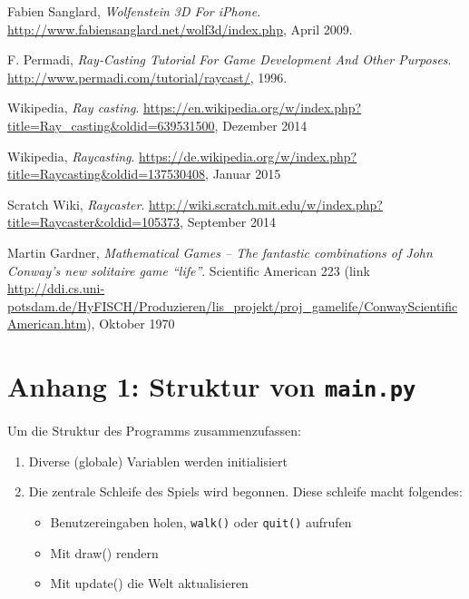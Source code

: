 \documentclass[a4paper,12pt]{report}
\begin{document}
\begin{thebibliography}{9}

  Fabien Sanglard,
  \emph{Wolfenstein 3D For iPhone}.
  \url{http://www.fabiensanglard.net/wolf3d/index.php},
  April 2009.

  F. Permadi,
  \emph{Ray-Casting Tutorial For Game Development And Other Purposes}.
  \url{http://www.permadi.com/tutorial/raycast/},
  1996.

  Wikipedia,
  \emph{Ray casting}.
  \url{https://en.wikipedia.org/w/index.php?title=Ray_casting&oldid=639531500},
  Dezember 2014

  Wikipedia,
  \emph{Raycasting}.
  \url{https://de.wikipedia.org/w/index.php?title=Raycasting&oldid=137530408},
  Januar 2015

  Scratch Wiki,
  \emph{Raycaster}.
  \url{http://wiki.scratch.mit.edu/w/index.php?title=Raycaster&oldid=105373},
  September 2014
  
  Martin Gardner,
  \emph{ Mathematical Games – The fantastic combinations of John Conway's new solitaire game ``life''}.
  Scientific American 223 (link \url{http://ddi.cs.uni-potsdam.de/HyFISCH/Produzieren/lis_projekt/proj_gamelife/ConwayScientificAmerican.htm}),
  Oktober 1970

\end{thebibliography}

\appendix
\chapter*{Anhang 1: Struktur von \texttt{main.py}}
Um die Struktur des Programms zusammenzufassen:
\begin{spacing}{1.0}
\begin{framed}
\begin{enumerate}
	\item Diverse (globale) Variablen werden initialisiert
	\item Die zentrale Schleife des Spiels wird begonnen. Diese schleife macht folgendes:
	\begin{itemize}
		\item Benutzereingaben holen, \texttt{walk()} oder \texttt{quit()} aufrufen
		\item Mit draw() rendern
		\item Mit update() die Welt aktualisieren
	\end{itemize}
\end{enumerate}
\end{framed}
\end{spacing}
\end{document}
